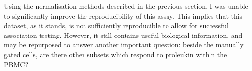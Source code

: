%

Using the normalisation methods described in the previous section, I was unable to significantly improve the reproducibility of this assay.
This implies that this dataset, as it stands, is not sufficiently reproducible to allow for successful association testing.
However, it still contains useful biological information, and may be repurposed to answer another important question:
beside the manually gated cells, are there other subsets which respond to proleukin within the \gls{PBMC}?

